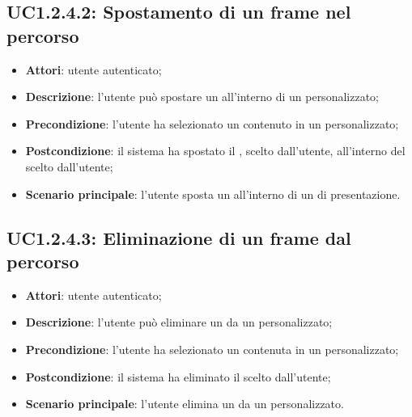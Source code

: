 \subsection{UC1.2.4.2: Spostamento di un frame nel percorso}
\label{UC1.2.4.2}
\begin{itemize}
\item \textbf{Attori}: utente autenticato;
\item \textbf{Descrizione}: l'utente può spostare un  all'interno di un  personalizzato;
\item \textbf{Precondizione}: l'utente ha selezionato un  contenuto in un  personalizzato;
\item \textbf{Postcondizione}: il sistema ha spostato il , scelto dall'utente, all'interno del  scelto dall'utente;
\item \textbf{Scenario principale}:
l'utente sposta un  all'interno di un  di presentazione.
\end{itemize}
\subsection{UC1.2.4.3: Eliminazione di un frame dal percorso}
\label{UC1.2.4.3}
\begin{itemize}
\item \textbf{Attori}: utente autenticato;
\item \textbf{Descrizione}: l'utente può eliminare un  da un  personalizzato;
\item \textbf{Precondizione}: l'utente ha selezionato un  contenuta in un  personalizzato;
\item \textbf{Postcondizione}: il sistema ha eliminato il  scelto dall'utente;
\item \textbf{Scenario principale}:
l'utente elimina un  da un  personalizzato.
\end{itemize}

